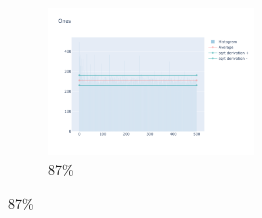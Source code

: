 \documentclass[12pt, fleqn]{report}                             %
\theoremstyle{break}                                            %
\begin{document}
\begin{figure}[ht!]
\begin{subfigure}[b]{0.4\linewidth}
          \includegraphics[width=0.6\textwidth]{Images/150/dia-d.png}
          \caption{87\%}
        \end{subfigure}
      \end{figure}



      \clearpage
\end{document}
